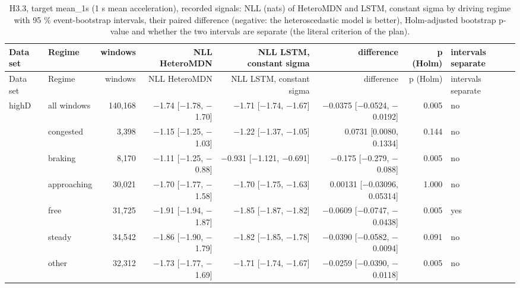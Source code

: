 \begingroup
\footnotesize
\begin{longtable}{llrrrrrl}
\caption{H3.3, target mean\_1s (1 s mean acceleration), recorded signals: NLL (nats) of HeteroMDN and LSTM, constant sigma by driving regime with 95 \% event-bootstrap intervals, their paired difference (negative: the heteroscedastic model is better), Holm-adjusted bootstrap p-value and whether the two intervals are separate (the literal criterion of the plan).}\label{tab:t3-h33-nll--raw--mean-1s} \\
\toprule
Data set & Regime & windows & NLL HeteroMDN & NLL LSTM, constant sigma & difference & p (Holm) & intervals separate \\
\midrule
\endfirsthead
\toprule
Data set & Regime & windows & NLL HeteroMDN & NLL LSTM, constant sigma & difference & p (Holm) & intervals separate \\
\midrule
\endhead
\bottomrule
\endlastfoot
highD & all windows & 140,168 & $-$1.74 [$-$1.78, $-$1.70] & $-$1.71 [$-$1.74, $-$1.67] & $-$0.0375 [$-$0.0524, $-$0.0192] & 0.005 & no \\
 & congested & 3,398 & $-$1.15 [$-$1.25, $-$1.03] & $-$1.22 [$-$1.37, $-$1.05] & 0.0731 [0.0080, 0.1334] & 0.144 & no \\
 & braking & 8,170 & $-$1.11 [$-$1.25, $-$0.88] & $-$0.931 [$-$1.121, $-$0.691] & $-$0.175 [$-$0.279, $-$0.088] & 0.005 & no \\
 & approaching & 30,021 & $-$1.70 [$-$1.77, $-$1.58] & $-$1.70 [$-$1.75, $-$1.63] & 0.00131 [$-$0.03096, 0.05314] & 1.000 & no \\
 & free & 31,725 & $-$1.91 [$-$1.94, $-$1.87] & $-$1.85 [$-$1.87, $-$1.82] & $-$0.0609 [$-$0.0747, $-$0.0438] & 0.005 & yes \\
 & steady & 34,542 & $-$1.86 [$-$1.90, $-$1.79] & $-$1.82 [$-$1.85, $-$1.78] & $-$0.0390 [$-$0.0582, $-$0.0094] & 0.091 & no \\
 & other & 32,312 & $-$1.73 [$-$1.77, $-$1.69] & $-$1.71 [$-$1.74, $-$1.67] & $-$0.0259 [$-$0.0390, $-$0.0118] & 0.005 & no \\

\end{longtable}
